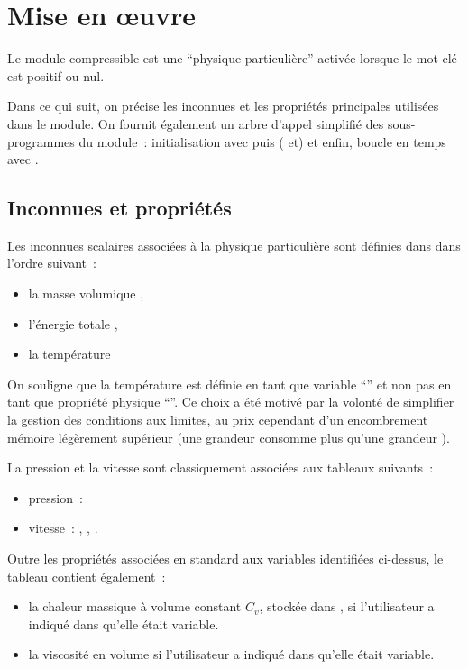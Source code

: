\section*{Mise en \oe uvre}

Le module compressible est une ``physique particulière'' activée lorsque le
mot-clé  est positif ou nul.

Dans ce qui suit, on précise les inconnues et les propriétés
principales utilisées dans le module.
On fournit également un arbre d'appel simplifié des sous-programmes du
module~: initialisation avec  puis ( et)  et
enfin, boucle en temps avec .


\subsection*{Inconnues et propriétés}

Les  inconnues scalaires associées à la physique
particulière sont définies dans  dans l'ordre
suivant~:
\begin{itemize}
\item la masse volumique ,
\item l'énergie totale   ,
\item la température     
\end{itemize}

On souligne que la température est définie en tant que variable ``'' et
non pas en tant que propriété physique ``''. Ce choix a été
motivé par la volonté de simplifier la gestion des conditions aux limites,
au prix cependant d'un encombrement mémoire légèrement supérieur (une
grandeur  consomme plus qu'une grandeur ).

La pression et la vitesse sont classiquement associées aux tableaux suivants~:
\begin{itemize}
\item pression~: 
\item vitesse~: , , .
\end{itemize}


\bigskip
Outre les propriétés associées en standard aux variables
identifiées ci-dessus, le
tableau  contient également~:
 \begin{itemize}
\item la chaleur massique à volume constant $C_v$, stockée dans
,
      si  l'utilisateur a indiqué dans  qu'elle était variable.
\item la viscosité en volume 
      si  l'utilisateur a indiqué dans  qu'elle était variable.
\end{itemize}


